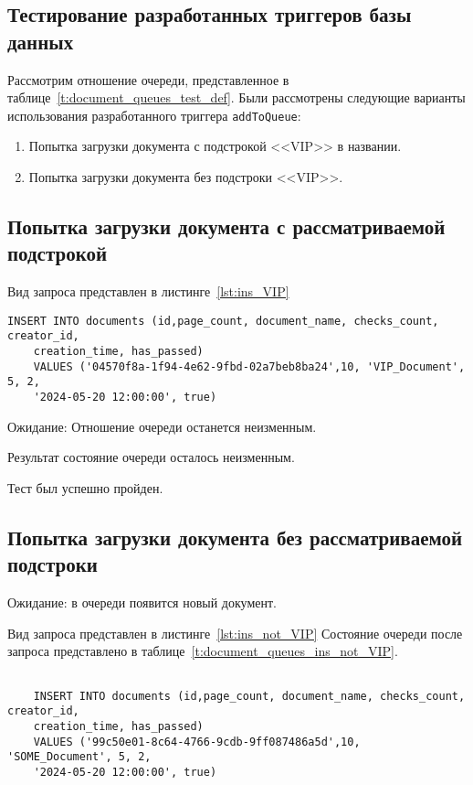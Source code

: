 \subsection{Тестирование разработанных триггеров базы данных}
Рассмотрим отношение очереди, представленное в
таблице~\ref{t:document_queues_test_def}.
Были рассмотрены следующие варианты использования разработанного триггера
\texttt{addToQueue}:
\begin{enumerate}
	\item Попытка загрузки документа с подстрокой <<VIP>> в названии.
	\item Попытка загрузки документа  без подстроки <<VIP>>.
\end{enumerate}

\subsection{Попытка загрузки документа с рассматриваемой подстрокой}

Вид запроса представлен в листинге~\ref{lst:ins_VIP}
\begin{lstlisting}[caption=Запрос загрузки документа с подстрокой
	<<VIP>>,frame=tlrb,label=lst:ins_VIP]
	INSERT INTO documents (id,page_count, document_name, checks_count, creator_id,
	creation_time, has_passed)
	VALUES ('04570f8a-1f94-4e62-9fbd-02a7beb8ba24',10, 'VIP_Document', 5, 2,
	'2024-05-20 12:00:00', true)
\end{lstlisting}

Ожидание: Отношение очереди останется неизменным.

Результат состояние очереди осталось неизменным.

Тест был успешно пройден.
\subsection{Попытка загрузки документа без рассматриваемой подстроки}
Ожидание: в очереди появится новый документ.

Вид запроса представлен в листинге~\ref{lst:ins_not_VIP}
Состояние очереди после запроса представлено в
таблице~\ref{t:document_queues_ins_not_VIP}.

\begin{lstlisting}[caption=Запрос загрузки документа без подстоки
	<<VIP>>,frame=tlrb,label=lst:ins_not_VIP]
	
	INSERT INTO documents (id,page_count, document_name, checks_count, creator_id,
	creation_time, has_passed)
	VALUES ('99c50e01-8c64-4766-9cdb-9ff087486a5d',10, 'SOME_Document', 5, 2,
	'2024-05-20 12:00:00', true)
\end{lstlisting}

